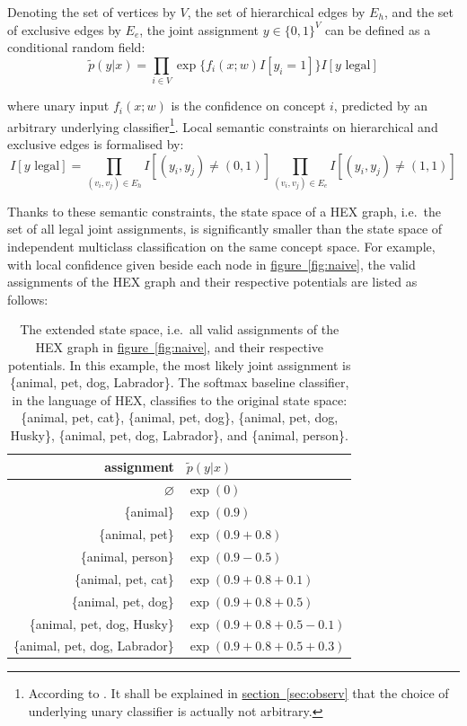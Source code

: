 \documentclass[11pt,a4paper]{article}
\begin{document}
Denoting the set of vertices by $V$, the set of hierarchical edges by $E_h$, and the set of exclusive edges by $E_e$, the joint assignment $y\in\{0,1\}^V$ can be defined as a conditional random field:
\begin{equation}
\tilde{p}(y|x)=\prod_{i\in V}\exp\{f_i(x;w)I[y_i=1]\}I[y\text{ legal}]
\label{eqn:naive}
\end{equation}

where unary input $f_i(x;w)$ is the confidence on concept $i$, predicted by an arbitrary underlying classifier\footnote{According to \cite{deng2014large}. It shall be explained in \hyperref[sec:observ]{section~\ref{sec:observ}} that the choice of underlying unary classifier is actually not arbitrary.}. Local semantic constraints on hierarchical and exclusive edges is formalised by:
\begin{equation}
I[y\text{ legal}]=\prod_{(v_i,v_j)\in E_h}I[(y_i,y_j)\neq(0,1)]\prod_{(v_i,v_j)\in E_e}I[(y_i,y_j)\neq(1,1)]
\label{eqn:legal}
\end{equation}

Thanks to these semantic constraints, the state space of a HEX graph, i.e.\ the set of all legal joint assignments, is significantly smaller than the state space of independent multiclass classification on the same concept space. For example, with local confidence given beside each node in \hyperref[fig:naive]{figure~\ref{fig:naive}}, the valid assignments of the HEX graph and their respective potentials are listed as follows:

\begin{table}[htbp]
\centering
\begin{tabular}{r|l}
assignment & $\tilde{p}(y|x)$\\
\hline
$\varnothing$ & $\exp(0)$\\
\{animal\} & $\exp(0.9)$\\
\{animal, pet\} & $\exp(0.9+0.8)$\\
\{animal, person\} & $\exp(0.9-0.5)$\\
\{animal, pet, cat\} & $\exp(0.9+0.8+0.1)$\\
\{animal, pet, dog\} & $\exp(0.9+0.8+0.5)$\\
\{animal, pet, dog, Husky\} & $\exp(0.9+0.8+0.5-0.1)$\\
\{animal, pet, dog, Labrador\} & $\exp(0.9+0.8+0.5+0.3)$
\end{tabular}
\caption{The extended state space, i.e.\ all valid assignments of the HEX graph in \hyperref[fig:naive]{figure~\ref{fig:naive}}, and their respective potentials. In this example, the most likely joint assignment is \{animal, pet, dog, Labrador\}. The softmax baseline classifier, in the language of HEX, classifies to the original state space: \{animal, pet, cat\}, \{animal, pet, dog\}, \{animal, pet, dog, Husky\}, \{animal, pet, dog, Labrador\}, and \{animal, person\}.}
\label{tab:naive}
\end{table}
\end{document}
